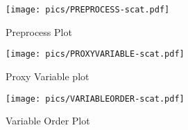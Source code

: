 \begin{figure}[htb]
	\centering
	\texttt{[image: pics/PREPROCESS-scat.pdf]}
	\caption{Preprocess Plot}
	\label{fig:preprocesss}
\end{figure}

\begin{figure}[htb]
	\centering
	\texttt{[image: pics/PROXYVARIABLE-scat.pdf]}
	\caption{Proxy Variable plot}
	\label{fig:proxyvariables}
\end{figure}

\begin{figure}[htb]
	\centering
	\texttt{[image: pics/VARIABLEORDER-scat.pdf]}
	\caption{Variable Order Plot}
	\label{fig:variableorders}
\end{figure}

